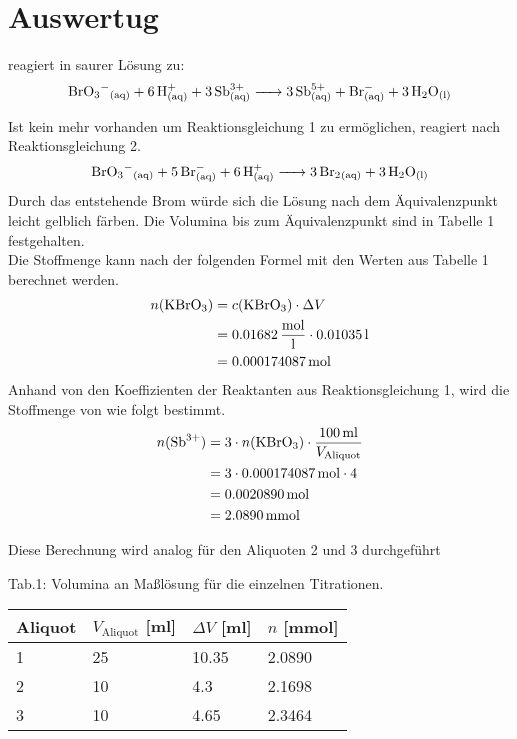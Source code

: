 \documentclass[12pt]{scrartcl} %
\begin{document}
\section{Auswertug}
 reagiert in saurer Lösung zu:
\begin{equation}
    \ce{BrO3^{-}_{(aq)} + 6 H^{+}_{(aq)} + 3 Sb^{3+}_{(aq)} -> 3 Sb^{5+}_{(aq)} + Br^{-}_{(aq)} + 3 H2O_{(l)}}
\end{equation}

Ist kein  mehr vorhanden um Reaktionsgleichung 1 zu ermöglichen, reagiert  nach Reaktionsgleichung 2.
\begin{equation}
    \ce{BrO3^{-}_{(aq)} + 5 Br^{-}_{(aq)} + 6 H^{+}_{(aq)} -> 3 Br2_{(aq)} + 3 H2O_{(l)}}
\end{equation}
Durch das entstehende Brom würde sich die Lösung nach dem Äquivalenzpunkt leicht gelblich färben.
Die Volumina bis zum Äquivalenzpunkt sind in Tabelle 1 festgehalten.\\
Die Stoffmenge kann nach der folgenden Formel mit den Werten aus Tabelle 1 berechnet werden.
\begin{align*}
    n(\ce{KBrO3}) &= c(\ce{KBrO3}) \cdot \Delta V\\
    &= 0.01682\,\mathrm{\frac{mol}{l}} \cdot 0.01035\,\mathrm{l}\\
    &= 0.000174087\,\mathrm{mol}
\end{align*}
\newpage
Anhand von den Koeffizienten der Reaktanten aus Reaktionsgleichung 1, wird die Stoffmenge von  wie folgt bestimmt.
\begin{align*}
    n(\ce{Sb^{3+}}) &= 3 \cdot n(\ce{KBrO3}) \cdot \frac{100\,\mathrm{ml}}{V_{\mathrm{Aliquot}}}\\
    &= 3 \cdot 0.000174087\,\mathrm{mol} \cdot 4\\
    &= 0.0020890\,\mathrm{mol}\\
    &= 2.0890\,\mathrm{mmol}
\end{align*} 

Diese Berechnung wird analog für den Aliquoten 2 und 3 durchgeführt

\begin{center}
    Tab.1: Volumina an Maßlösung für die einzelnen Titrationen.
    \begin{tabular}{l l l l}
        \hline
        Aliquot & $V_{\mathrm{Aliquot}}$ [ml] & $\Delta V$ [ml] & $n$ [mmol]\\
        \hline
        1 & 25 & 10.35 & 2.0890\\
        2 & 10 & 4.3 & 2.1698\\
        3 & 10 & 4.65 & 2.3464\\
        \hline
    \end{tabular}
\end{center}
\end{document}

